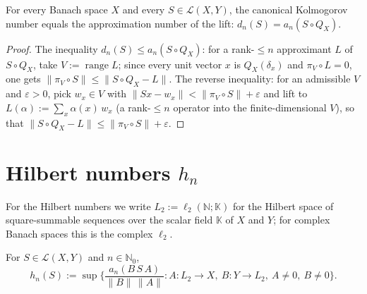 \begin{theorem}
\label{thm:pietsch-identity}
\leanok
{}
For every Banach space $X$ and every $S \in \mathcal{L}(X, Y)$, the
canonical Kolmogorov number equals the approximation number of the lift:
$d_n(S) = a_n(S \circ Q_X)$.
\end{theorem}
\begin{proof}
\leanok
{}
The inequality $d_n(S) \le a_n(S \circ Q_X)$: for a rank-$\le n$ approximant
$L$ of $S \circ Q_X$, take $V := \operatorname{range} L$; since every unit
vector $x$ is $Q_X(\delta_x)$ and $\pi_V \circ L = 0$, one gets
$\|\pi_V \circ S\| \le \|S \circ Q_X - L\|$. The reverse inequality: for an
admissible $V$ and $\varepsilon > 0$, pick $w_x \in V$ with
$\|S x - w_x\| < \|\pi_V \circ S\| + \varepsilon$ and lift to
$L(\alpha) := \sum_x \alpha(x)\, w_x$ (a rank-$\le n$ operator into the
finite-dimensional $V$), so that $\|S \circ Q_X - L\| \le \|\pi_V \circ S\| +
\varepsilon$.
\end{proof}

\section{Hilbert numbers $h_n$}
\label{sec:hil}

For the Hilbert numbers we write $L_2 := \ell_2(\mathbb{N}; \mathbb{K})$ for
the Hilbert space of square-summable sequences over the scalar field
$\mathbb{K}$ of $X$ and $Y$; for complex Banach spaces this is the complex
$\ell_2$.

\begin{definition}
\label{def:hilbert-number}
\leanok
{}
For $S \in \mathcal{L}(X, Y)$ and $n \in \mathbb{N}_0$,
\[
h_n(S) := \sup \biggl\{ \frac{a_n(B \, S \, A)}{\|B\| \, \|A\|} :
            A : L_2 \to X, \ B : Y \to L_2, \ A \neq 0, \ B \neq 0
          \biggr\}.
\]
\end{definition}

